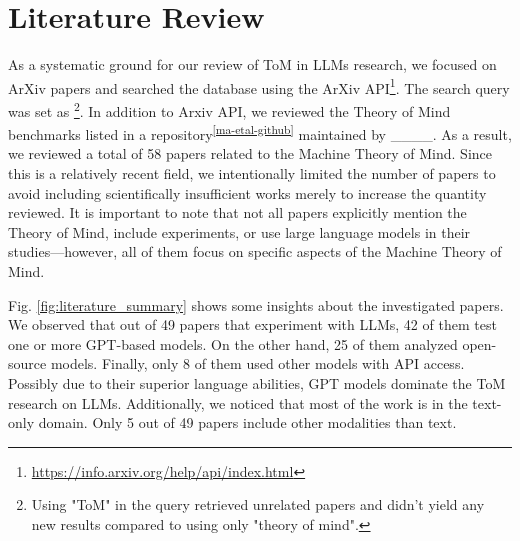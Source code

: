\section{Literature Review}
\label{review}

\begin{figure*}[h]
    \centering
    \hspace{0.05\textwidth}
    \caption{Comparison of the number of papers inspecting different LLMs (left) and modalities (right).}
    \label{fig:literature_summary}
\end{figure*}

As a systematic ground for our review of ToM in LLMs research, we focused on ArXiv papers and searched the database using the ArXiv API\footnote{\url{https://info.arxiv.org/help/api/index.html}}. The search query was set as   \footnote{Using "ToM" in the query retrieved unrelated papers and didn’t yield any new results compared to using only "theory of mind".}.  In addition to Arxiv API, we reviewed the Theory of Mind benchmarks listed in a repository\textsuperscript{\ref{ma-etal-github}} maintained by ____.
As a result, we reviewed a total of 58 papers related to the Machine Theory of Mind. Since this is a relatively recent field, we intentionally limited the number of papers to avoid including scientifically insufficient works merely to increase the quantity reviewed.
It is important to note that not all papers explicitly mention the Theory of Mind, include experiments, or use large language models in their studies—however, all of them focus on specific aspects of the Machine Theory of Mind.

\begin{comment}
\begin{figure}[h]
    \centering
    \subfigure{
        \texttt{[image: figures/results\_year.pdf]}
    }
    \caption{Comparison of release years of papers retrieved from the Arxiv API.}
    \label{fig:api-years}
\end{figure}
\end{comment}

Fig. \ref{fig:literature_summary} shows some insights about the investigated papers. We observed that out of 49 papers that experiment with LLMs, 42 of them test one or more GPT-based models. On the other hand, 25 of them analyzed open-source models. Finally, only 8 of them used other models with API access. Possibly due to their superior language abilities, GPT models dominate the ToM research on LLMs. Additionally, we noticed that most of the work is in the text-only domain. Only 5 out of 49 papers include other modalities than text.

